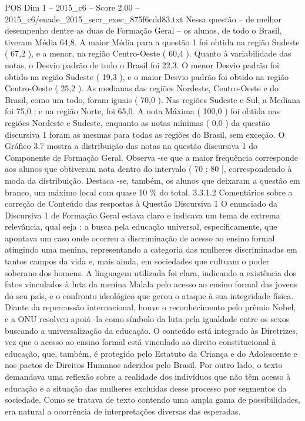 \begin{textsample}{POS Dim 1 – 2015\_c6 – Score 2.00 – 2015\_c6/enade\_2015\_secr\_exec\_875f6cdd83.txt}
Nessa questão – de melhor desempenho dentre as duas de Formação Geral – os alunos, de todo o Brasil, tiveram Média 64,8.
A maior Média para a questão 1 foi obtida na região Sudeste ( 67,2 ), e a menor, na região Centro-Oeste ( 60,4 ).
Quanto à variabilidade das notas, o Desvio padrão de todo o Brasil foi 22,3.
O menor Desvio padrão foi obtido na região Sudeste ( 19,3 ), e o maior Desvio padrão foi obtido na região Centro-Oeste ( 25,2 ).
As medianas das regiões Nordeste, Centro-Oeste e do Brasil, como um todo, foram iguais ( 70,0 ).
Nas regiões Sudeste e Sul, a Mediana foi 75,0 ; e na região Norte, foi 65,0.
A nota Máxima ( 100,0 ) foi obtida nas regiões Nordeste e Sudeste, enquanto as notas mínimas ( 0,0 ) da questão discursiva 1 foram as mesmas para todas as regiões do Brasil, sem exceção.
O Gráfico 3.7 mostra a distribuição das notas na questão discursiva 1 do Componente de Formação Geral.
Observa -se que a maior frequência corresponde aos alunos que obtiveram nota dentro do intervalo ( 70 ; 80 ], correspondendo à moda da distribuição.
Destaca -se, também, os alunos que deixaram a questão em branco, um máximo local com quase 10 \% do total. 3.3.1.2 Comentários sobre a correção de Conteúdo das respostas à Questão Discursiva 1 O enunciado da Discursiva 1 de Formação Geral estava claro e indicava um tema de extrema relevância, qual seja : a busca pela educação universal, especificamente, que apontava um caso onde ocorreu a discriminação de acesso ao ensino formal atingindo uma menina, representando a categoria das mulheres discriminadas em tantos campos da vida e, mais ainda, em sociedades que cultuam o poder soberano dos homens.
A linguagem utilizada foi clara, indicando a existência dos fatos vinculados à luta da menina Malala pelo acesso ao ensino formal das jovens do seu país, e o confronto ideológico que gerou o ataque à sua integridade física.
Diante da repercussão internacional, houve o reconhecimento pelo prêmio Nobel, e a ONU resolveu apoiá -la como símbolo da luta pela igualdade entre os sexos buscando a universalização da educação.
O conteúdo está integrado às Diretrizes, vez que o acesso ao ensino formal está vinculado ao direito constitucional à educação, que, também, é protegido pelo Estatuto da Criança e do Adolescente e nos pactos de Direitos Humanos aderidos pelo Brasil.
Por outro lado, o texto demandava uma reflexão sobre a realidade dos indivíduos que não têm acesso à educação e a situação das mulheres excluídas desse processo por segmentos da sociedade.
Como se tratava de texto contendo uma ampla gama de possibilidades, era natural a ocorrência de interpretações diversas das esperadas.

\end{textsample}
